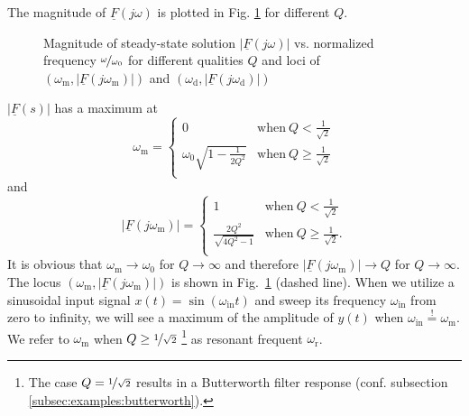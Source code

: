 \documentclass{article}[11pt]
\begin{document}
The magnitude of $\underline{F}(j\omega)$ is plotted in 
Fig. \ref{fig:plot-fs} for different $Q$.
\begin{figure}[H]
  \centering
  
  \caption{Magnitude of steady-state solution 
    $\left|\underline{F}(j\omega)\right|$ vs. normalized 
    frequency $\nicefrac{\omega}{\omega_0}$ for different qualities $Q$ and loci 
    of $(\omega_{\mathrm{m}}, \left|\underline{F}(j\omega_{\mathrm{m}})\right|)$
    and $(\omega_{\mathrm{d}}, \left|\underline{F}(j\omega_{\mathrm{d}})\right|)$}
  \label{fig:plot-fs}
\end{figure}

$\left|\underline{F}(s)\right|$ has a maximum at 
\begin{equation}
\omega_{\mathrm{m}}=
\begin{cases}
0 & \mathrm{when} \ Q <\frac{1}{\sqrt{2}} \\
\omega_0 \sqrt{1-\frac{1}{2Q^2}} & \mathrm{when} \ Q\geq\frac{1}{\sqrt{2}} \\
\end{cases} 
\end{equation}
and
\begin{equation}
\left|\underline{F}(j\omega_{\mathrm{m}})\right| =
\begin{cases}
1 & \mathrm{when} \ Q <\frac{1}{\sqrt{2}} \\
\frac{2 Q^2}{\sqrt{4Q^2-1}} & \mathrm{when} \ Q\geq\frac{1}{\sqrt{2}}. \\
\end{cases} 
\end{equation}
It is obvious that  $\omega_{\mathrm{m}} \rightarrow \omega_{\mathrm{0}}$
for $Q \rightarrow \infty$ and therefore 
$\left|\underline{F}(j\omega_{\mathrm{m}})\right| \rightarrow  Q$
for $Q \rightarrow \infty$.
The locus $(\omega_{\mathrm{m}}, \left|\underline{F}(j\omega_{\mathrm{m}})\right|)$
is shown in Fig.~\ref{fig:plot-fs} (dashed line).
When we utilize a sinusoidal input signal $x(t)=\sin\left(\omega_{\mathrm{in}}t\right)$ 
and sweep its frequency $\omega_{\mathrm{in}}$ from zero to infinity,
we will see a maximum of the amplitude of $y(t)$ when 
$\omega_{\mathrm{in}} \stackrel{!}{=} \omega_{\mathrm{m}}$.
We refer to $\omega_{\mathrm{m}}$ when $Q\geq\nicefrac{1}{\sqrt{2}}$%
\footnote{The case $Q = \nicefrac{1}{\sqrt{2}}$  results
in a Butterworth filter response 
(conf. subsection \ref{subsec:examples:butterworth}).}
as resonant frequent $\omega_{\mathrm{r}}$.

\medskip
\end{document}
